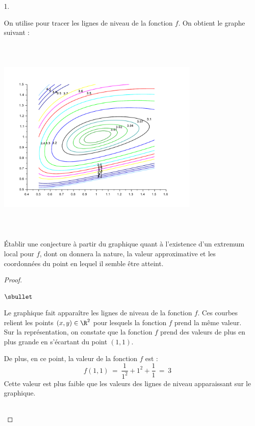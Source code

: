 \documentclass[11pt]{article}%
\begin{document}
\begin{noliste}{1.}
  \setlength{\itemsep}{4mm}
\item On utilise \Scilab{} pour tracer les lignes de niveau de la
  fonction $f$. On obtient le graphe suivant :~\\[-.6cm]
  \begin{center}
    \includegraphics[width=10cm,height=10cm]{../Figures/ECRICOME_2019/Ecricome_2019_figure1.pdf}
  \end{center}
  Établir une conjecture à partir du graphique quant à l'existence
  d'un extremum local pour $f$, dont on donnera la nature, la valeur
  approximative et les coordonnées du point en lequel il semble être
  atteint.
  
  \begin{proof}~%
    \begin{noliste}{$\sbullet$}
    \item Le graphique fait apparaître les lignes de niveau de la
      fonction $f$. Ces courbes relient les points $(x, y) \in \R^2$
      pour lesquels la fonction $f$ prend la même valeur. Sur la
      représentation, on constate que la fonction $f$ prend des
      valeurs de plus en plus grande en s'écartant du point $(1,
      1)$. %

    \item De plus, en ce point, la valeur de la fonction $f$ est :
      \[
      f(1, 1) \ = \ \dfrac{1}{1^2} + 1^2 + \dfrac{1}{1} \ = \ 3
      \]
      Cette valeur est plus faible que les valeurs des lignes de
      niveau apparaissant sur le graphique. %
    \end{noliste}
    ~\\[-1.2cm]
  \end{proof}



\end{noliste}
\end{document}
